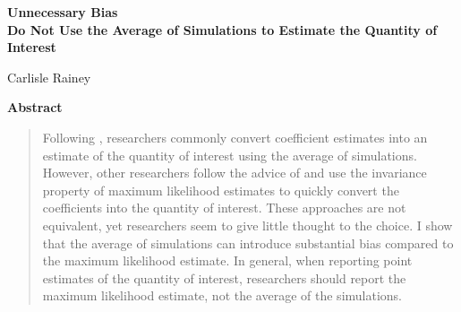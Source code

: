 \documentclass[10pt]{article}
\begin{document}
\begin{center}
{\LARGE \textbf{Unnecessary Bias}}\\\vspace{2mm}
{ \textbf{Do Not Use the Average of Simulations to Estimate the Quantity of Interest}}

\vspace{5mm}

Carlisle Rainey
\end{center}

\vspace{5mm}

{\centerline{\textbf{Abstract}}}
\begin{quote}\noindent
Following \cite{KingTomzWittenberg2000}, researchers commonly convert coefficient estimates into an estimate of the quantity of interest using the average of simulations. However, other researchers follow the advice of \cite{King1989} and use the invariance property of maximum likelihood estimates to quickly convert the coefficients into the quantity of interest. These approaches are not equivalent, yet researchers seem to give little thought to the choice. I show that the average of simulations can introduce substantial bias compared to the maximum likelihood estimate. In general, when reporting point estimates of the quantity of interest, researchers should report the maximum likelihood estimate, not the average of the simulations. 
 \end{quote}



\thispagestyle{empty}

\onehalfspace
\end{document}
